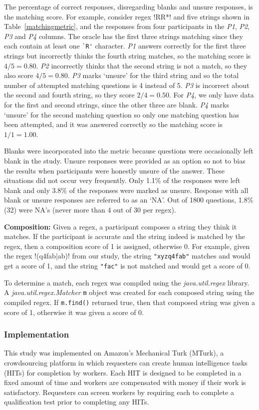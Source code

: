The percentage of correct responses, disregarding blanks and unsure responses, is the matching score.
For example, consider regex \cverb!RR*! and five strings shown in Table~\ref{matchingmetric}, and the responses from four participants in the \emph{P1}, \emph{P2}, \emph{P3} and \emph{P4} columns.
The oracle has the first three strings matching since they each contain at least one \verb!`R'! character. \emph{P1} answers correctly for the first three strings but incorrectly thinks the fourth string matches, so the matching score is $4/5 = 0.80$. \emph{P2} incorrectly thinks that the second string is not a match, so they also score $4/5 = 0.80$.  \emph{P3} marks `unsure' for the third string and so the total number of attempted matching questions is 4 instead of 5. \emph{P3} is incorrect about the second and fourth string, so they score $2/4 = 0.50$.  For \emph{P4}, we only have data for the first and second strings, since the other three are blank.  \emph{P4} marks `unsure' for the second matching question so only one matching question has been attempted, and it was answered correctly so the matching score is $1/1 = 1.00$.

Blanks were incorporated into the metric because questions were occasionally left blank in the study. Unsure responses were provided as an option so not to bias the  results when participants were honestly unsure of the answer. These situations did not occur very frequently. Only 1.1\% of the responses were left blank and only 3.8\% of the responses were marked as unsure.  Response with all blank or unsure responses are referred to as an `NA'. Out of 1800 questions, 1.8\%(32) were NA's (never more than 4 out of 30 per regex).

\textbf{Composition:}
Given a regex, a participant composes a string they think it matches. If the participant is accurate and the string indeed is matched by the regex, then a composition score of 1 is assigned, otherwise 0.  For example, given the regex \cverb!(q4fab|ab)! from our study, the string \verb!"xyzq4fab"! matches and would get a score of 1, and the string \verb!"fac"! is not matched and would get a score of 0.

To determine a match, each regex was compiled using the \emph{java.util.regex} library. A \emph{java.util.regex.Matcher} {\tt m} object was created for each composed string using the compiled regex.  If {\tt m.find()} returned true, then that composed string was given a score of 1, otherwise it was given a score of 0.

\subsubsection{Implementation}
This study was implemented on Amazon's Mechanical Turk (MTurk),  a crowdsourcing platform in which requesters can create human intelligence tasks (HITs) for completion by workers. Each HIT is designed to be completed in a fixed amount of time and workers are compensated with money if their work is satisfactory. Requesters can screen workers by requiring each to complete a qualification test prior to completing any HITs.

